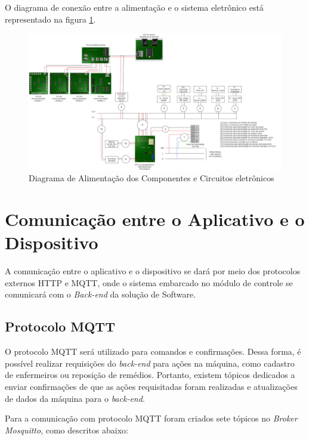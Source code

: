 O diagrama de conexão entre a alimentação e o sistema eletrônico está representado na figura \ref{fig:integracao_eletronica_energia}.

\hspace{-1.5cm}
\begin{figure}[H]
        \centering
        \includegraphics[width=1.1\textwidth]{figuras/integracao/integracao_energia_eletronica.png} 
        \caption{Diagrama de Alimentação dos Componentes e Circuitos eletrônicos}
        \label{fig:integracao_eletronica_energia}
    \end{figure}
    
    
\section{Comunicação entre o Aplicativo e o Dispositivo}
\label{app_dispositivo}

A comunicação entre o aplicativo e o dispositivo se dará por meio dos protocolos externos HTTP e MQTT, onde o sistema embarcado no módulo de controle se comunicará com o \textit{Back-end} da solução de Software.

\subsection{Protocolo MQTT}

O protocolo MQTT será utilizado para comandos e confirmações.  Dessa forma, é possível realizar requisições do \textit{back-end} para ações na máquina, como cadastro de enfermeiros ou reposição de remédios. Portanto, existem  tópicos dedicados a enviar confirmações de que as ações requisitadas foram realizadas e atualizações de dados da máquina para o \textit{back-end}.

Para a comunicação com protocolo MQTT foram criados sete tópicos no \textit{Broker Mosquitto}, como descritos abaixo:

